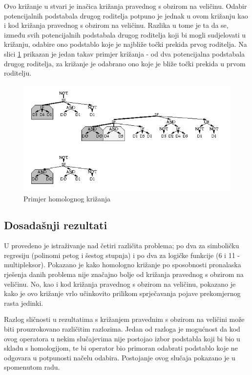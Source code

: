 Ovo križanje u stvari je inačica križanja pravednog s obzirom na veličinu. Odabir potencijalnih podstabala drugog roditelja potpuno je jednak u ovom križanju kao i kod križanja pravednog s obzirom na veličinu. Razlika u tome je ta da se, između svih potencijalnih podstabala drugog roditelja koji bi mogli sudjelovati u križanju, odabire ono podstablo koje je najbliže točki prekida prvog roditelja. Na slici \ref{crxHomo} prikazan je jedan takav primjer križanja - od dva potencijalna podstabala drugog roditelja, za križanje je odabrano ono koje je bliže točki prekida u prvom roditelju.

\begin{figure}[H]
	\centering
	\includegraphics[scale=0.6]{./slike/crxHomo.png}
	\caption{Primjer homolognog križanja}
	\label{crxHomo}
\end{figure}

\subsection{Dosadašnji rezultati}
U \cite{crxSizeFair}  provedeno je istraživanje nad četiri različita problema; po dva za simboličku regresiju (polinomi petog i šestog stupnja) i po dva za logičke funkcije (6 i 11 - multipleksor). Pokazano je kako homologno križanje po sposobnosti pronalaska rješenja danih problema nije značajno bolje od križanja pravednog s obzirom na veličinu. No, kao i kod križanja pravednog s obzirom na veličinu, pokazano je kako je ovo križanje vrlo učinkovito prilikom sprječavanja pojave prekomjernog rasta jedinki.

Razlog sličnosti u rezultatima s križanjem pravednim s obzirom na veličini može biti prouzrokovano različitim razlozima. Jedan od razloga je mogućnost da kod ovog operatora u nekim slučajevima nije postojao izbor podstabla koji bi bio u skladu s homologijom, te bi operator bio primoran odabrati podstablo koje ne odgovara u potpunosti načelu odabira. Postojanje ovog slučaja pokazano je u spomenutom radu.

